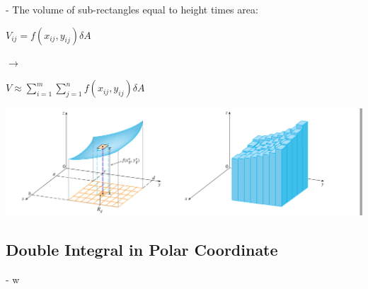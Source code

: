 \documentclass[12pt]{article}
\begin{document}
\bigbreak
- The volume of sub-rectangles equal to height times area:
\begin{mybox}
\begin{center}
$ V_{ij} = f(x_{ij}, y_{ij}) \delta A$
\end{center}
\end{mybox}
$\rightarrow$ 
\begin{mybox}
\begin{center}
$V \approx \displaystyle \sum_{i = 1}^{m} \sum_{j = 1}^{n} f(x_{ij},y_{ij}) \delta A$
\end{center}
\end{mybox}
\includegraphics[scale = 0.7]{hinh4}
\subsection{Double Integral in Polar Coordinate}
- w
\end{document}
